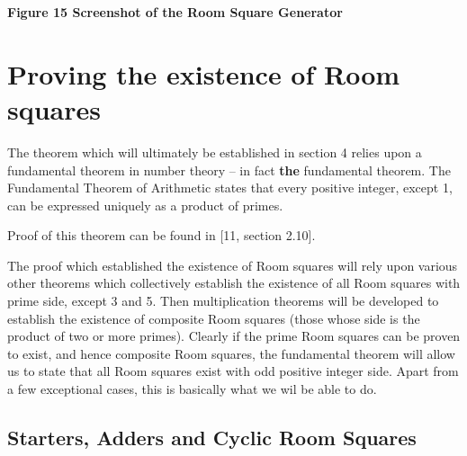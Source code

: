 \documentclass[
  12pt,
  a4paper]{book}
\begin{document}
\textbf{Figure 15 Screenshot of the Room Square Generator}

\hypertarget{proving-the-existence-of-room-squares}{%
\chapter{Proving the existence of Room
squares}\label{proving-the-existence-of-room-squares}}

The theorem which will ultimately be established in section 4 relies
upon a fundamental theorem in number theory -- in fact \textbf{the}
fundamental theorem. The Fundamental Theorem of Arithmetic states that
every positive integer, except 1, can be expressed uniquely as a product
of primes.

Proof of this theorem can be found in {[}11, section 2.10{]}.

The proof which established the existence of Room squares will rely upon
various other theorems which collectively establish the existence of all
Room squares with prime side, except 3 and 5. Then multiplication
theorems will be developed to establish the existence of composite Room
squares (those whose side is the product of two or more primes). Clearly
if the prime Room squares can be proven to exist, and hence composite
Room squares, the fundamental theorem will allow us to state that all
Room squares exist with odd positive integer side. Apart from a few
exceptional cases, this is basically what we wil be able to do.

\hypertarget{starters-adders-and-cyclic-room-squares}{%
\section{Starters, Adders and Cyclic Room
Squares}\label{starters-adders-and-cyclic-room-squares}}
\end{document}
